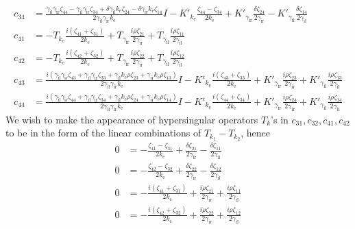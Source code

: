 \begin{align*}
  c_{34} &= \frac{\gamma_\text{il} \gamma_\text{ir} \zeta_{44}-\gamma_\text{il} \gamma_\text{ir} \zeta_{34}+\delta \gamma_\text{il} k_\text{e} \zeta_{24}-\delta \gamma_\text{ir} k_\text{e} \zeta_{14}}{2 \gamma_\text{il} \gamma_\text{ir} k_\text{e}} I-K'_{k_\text{e}} \frac{\zeta_{44}-\zeta_{34}}{2 k_\text{e}}+K'_{\gamma_\text{ir}} \frac{\delta \zeta_{24}}{2 \gamma_\text{ir}}-K'_{\gamma_\text{il}} \frac{\delta \zeta_{14}}{2 \gamma_\text{il}} \\
  c_{41} &= -T_{k_\text{e}} \frac{i(\zeta_{41}+\zeta_{31})}{2 k_\text{e}}+ T_{\gamma_\text{ir}} \frac{i \rho\zeta_{21}}{2 \gamma_\text{ir}}+T_{\gamma_\text{il}} \frac{i \rho \zeta_{11}}{2 \gamma_\text{il}} \\
  c_{42} &= -T_{k_\text{e}} \frac{i(\zeta_{42}+\zeta_{32})}{2 k_\text{e}}+T_{\gamma_\text{ir}} \frac{i \rho\zeta_{22}}{2 \gamma_\text{ir}}+T_{\gamma_\text{il}} \frac{i \rho\zeta_{12}}{2 \gamma_\text{il}} \\
  c_{43} &= \frac{i(\gamma_\text{il} \gamma_\text{ir} \zeta_{43}+\gamma_\text{il} \gamma_\text{ir} \zeta_{33}+\gamma_\text{il} k_\text{e} \rho \zeta_{23}+\gamma_\text{ir} k_\text{e} \rho \zeta_{13})}{2 \gamma_\text{il} \gamma_\text{ir} k_\text{e}} I-K'_{k_\text{e}} \frac{i(\zeta_{43}+\zeta_{33})}{2 k_\text{e}}+K'_{\gamma_\text{ir}} \frac{i\rho \zeta_{23}}{2 \gamma_\text{ir}}+K'_{\gamma_\text{il}} \frac{i\rho \zeta_{13}}{2 \gamma_\text{il}} \\
  c_{44} &= \frac{i(\gamma_\text{il} \gamma_\text{ir} \zeta_{44}+\gamma_\text{il} \gamma_\text{ir} \zeta_{34}+\gamma_\text{il} k_\text{e} \rho \zeta_{24}+\gamma_\text{ir} k_\text{e} \rho \zeta_{14})}{2 \gamma_\text{il} \gamma_\text{ir} k_\text{e}} I-K'_{k_\text{e}} \frac{i(\zeta_{44}+\zeta_{34})}{2 k_\text{e}}+K'_{\gamma_\text{ir}} \frac{i\rho \zeta_{24}}{2 \gamma_\text{ir}}+K'_{\gamma_\text{il}} \frac{i\rho \zeta_{14}}{2 \gamma_\text{il}}
\end{align*}
We wish to make the appearance of hypersingular operators $T_k$'s in $c_{31}, c_{32}, c_{41}, c_{42}$ to be in the form of the linear combinations of $T_{k_1} - T_{k_2}$, hence
\begin{align*}
  0 &= - \frac{\zeta_{41}-\zeta_{31}}{2 k_\text{e}}+\frac{\delta\zeta_{21}}{2 \gamma_\text{ir}}-\frac{\delta \zeta_{11}}{2 \gamma_\text{il}} \\
  0 &= -\frac{\zeta_{42}-\zeta_{32}}{2 k_\text{e}} + \frac{\delta \zeta_{22}}{2 \gamma_\text{ir}}-\frac{\delta \zeta_{12}}{2 \gamma_\text{il}} \\
  0 &= -\frac{i(\zeta_{41}+\zeta_{31})}{2 k_\text{e}}+ \frac{i \rho\zeta_{21}}{2 \gamma_\text{ir}}+\frac{i \rho \zeta_{11}}{2 \gamma_\text{il}} \\
  0 &= -\frac{i(\zeta_{42}+\zeta_{32})}{2 k_\text{e}}+\frac{i \rho\zeta_{22}}{2 \gamma_\text{ir}}+\frac{i \rho\zeta_{12}}{2 \gamma_\text{il}} \\
\end{align*}
